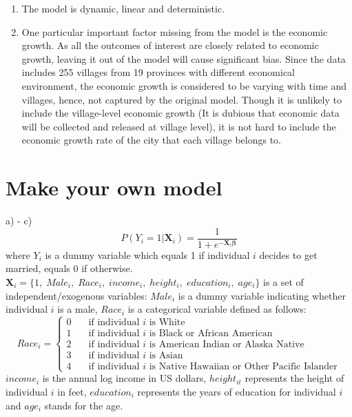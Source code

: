 \documentclass[12pt]{article}
\begin{document}
\begin{enumerate}[label={\alph*)}]
\item The model is dynamic, linear and deterministic.

\item One particular important factor missing from the model is the economic growth. As all the outcomes of interest are closely related to economic growth, leaving it out of the model will cause significant bias. Since the data includes 255 villages from 19 provinces with different economical environment, the economic growth is considered to be varying with time and villages, hence, not captured by the original model. Though it is unlikely to include the village-level economic growth (It is dubious that economic data will be collected and released at village level), it is not hard to include the economic growth rate of the city that each village belongs to.  
\end{enumerate}

\section{Make your own model}
\par a) - c)
    \begin{equation}
        P(Y_{i} = 1| \mathbf{X}_{i}) = \frac{1}{1+ e^{- \mathbf{X}_{i} \boldsymbol{\beta}}} 
    \end{equation}
where $Y_{i}$ is a dummy variable which equals 1 if individual $i$ decides to get married, equals 0 if otherwise. $\mathbf{X}_{i} = \{1, \; Male_{i}, \; Race_{i},\; income_{i}, \; height_{i},\; education_{i},\; age_{i} \}$ is a set of independent/exogenous variables: $Male_i$ is a dummy variable indicating whether individual $i$ is a male, $Race_i$ is a categorical variable defined as follows:
\[ Race_i =
  \begin{cases}
        0   & \quad \text{if individual  $i$ is White}\\
        1   & \quad \text{if individual $i$ is Black or African American}\\
        2  &  \quad \text{if individual $i$ is American Indian or Alaska Native}\\
        3  & \quad \text{if individual $i$ is Asian}\\
        4  & \quad \text{if individual $i$ is Native Hawaiian or Other Pacific Islander}
  \end{cases}
\]
$income_{i}$ is the annual log income in US dollars, $height_{it}$ represents the height of individual $i$ in feet, $education_{i}$ represents the years of education for individual $i$ and $age_{i}$ stands for the age. 
\end{document}
